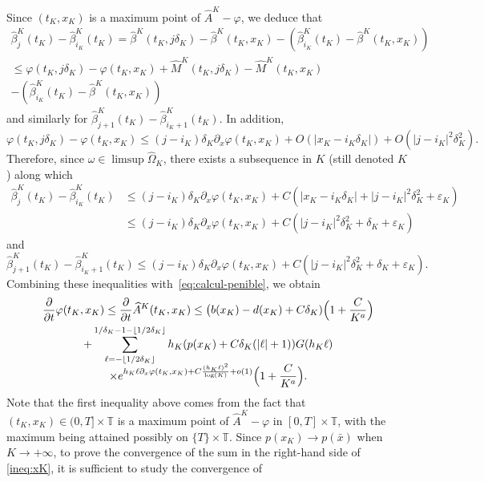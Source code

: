 \documentclass[10pt]{amsart}
\theoremstyle{plain}
\theoremstyle{remark}
\newcommand\T{\mathbb{T}}
\begin{document}
Since $(t_K,x_K)$ is a maximum point of $\widehat A^K-\varphi$, we deduce that
\begin{multline*}
\widehat \beta_j^K(t_K)-\widehat\beta_{i_K}^K(t_K)=\widehat{\beta}^K(t_K,j\delta_K)-\widehat{\beta}^K(t_K,x_K)-\left(\widehat\beta_{i_K}^K(t_K)-\widehat{\beta}^K(t_K,x_K)\right) \\
\leq\varphi(t_K,j\delta_K)-\varphi(t_K,x_K)+\widehat{M}^K(t_K,j\delta_K)-\widehat{M}^K(t_K,x_K)\\
-\left(\widehat\beta_{i_K}^K(t_K)-\widehat{\beta}^K(t_K,x_K)\right)
\end{multline*}
and similarly for $\widehat \beta_{j+1}^K(t_K)- \widehat\beta_{i_K+1}^K(t_K)$.
In addition,
\[
\varphi(t_K,j\delta_K)- \varphi(t_K,x_K)
\leq (j-i_K)\delta_K\partial_x \varphi(t_K,x_K)+O(|x_K-i_K\delta_K|)+O(|j-i_K|^2\delta_K^2).
\]
Therefore, since $\omega\in\limsup \widehat{\Omega}_K$, there exists a subsequence in $K$ (still denoted $K$) along which
\begin{align*}
\widehat\beta_j^K(t_K)-\widehat\beta_{i_K}^K(t_K) & \leq (j-i_K)\delta_K\partial_x \varphi(t_K,x_K)+C\left(|x_K-i_K\delta_K|+|j-i_K|^2\delta_K^2+\varepsilon_K\right) \\ & \leq (j-i_K)\delta_K\partial_x \varphi(t_K,x_K)+C (|j-i_K|^2\delta_K^2+\delta_K+\varepsilon_K)
\end{align*}
and
\[
\widehat\beta_{j+1}^K(t_K)-\widehat\beta_{i_K+1}^K(t_K)\leq (j-i_K)\delta_K\partial_x \varphi(t_K,x_K) +C(|j-i_K|^2\delta_K^2+\delta_K+\varepsilon_K).
\]
Combining these inequalities with~\eqref{eq:calcul-penible}, we obtain
\begin{multline}\label{ineq:xK}
\frac{\partial}{\partial t}\varphi(t_K,x_K) \leq\frac{\partial}{\partial t} \widehat A^K(t_K,x_K)
\leq \big(b(x_K)-d(x_K)+C\delta_K) \Bigl(1+\frac{C}{K^a} \Bigr)\\
+\sum_{\ell=-\lfloor 1/2\delta_K\rfloor}^{1/\delta_K-1-\lfloor 1/2\delta_K\rfloor}h_K (p(x_K)+C\delta_K(|\ell|+1)) G(h_K\ell) \\[-5pt]
\times
e^{h_K\ell\partial_x\varphi(t_K,x_K)+C\frac{(h_K\ell)^2}{\log(K)}+o(1)} \Bigl(1+\frac{C}{K^a} \Bigl).
\end{multline}
Note that the first inequality above comes from the fact that $(t_K,x_K)\in (0,T]\times \T $ is a maximum point of $\widehat A^K-\varphi$ in $[0,T]\times \T$, with the maximum being attained possibly on $\{T\}\times \T$.
Since $p(x_K)\to p(\bar{x})$ when $K\to+\infty$, to prove the convergence of the sum in the right-hand side of \eqref{ineq:xK}, it is sufficient to study the convergence of
\end{document}
